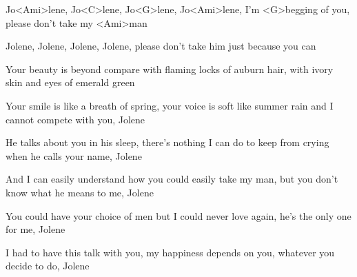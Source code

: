 

\zr
Jo<Ami>lene, Jo<C>lene, Jo<G>lene, Jo<Ami>lene,
I'm <G>begging of you, please don't take my <Ami>man

Jolene, Jolene, Jolene, Jolene,
please don't take him just because you can
\kr

\zs
Your beauty is beyond compare
with flaming locks of auburn hair,
with ivory skin and eyes of emerald green

Your smile is like a breath of spring,
your voice is soft like summer rain
and I cannot compete with you, Jolene
\ks

\zs
He talks about you in his sleep,
there's nothing I can do to keep
from crying when he calls your name, Jolene

And I can easily understand 
how you could easily take my man,
but you don't know what he means to me, Jolene
\ks

\zr\kr

\zs
You could have your choice of men
but I could never love again,
he's the only one for me, Jolene

I had to have this talk with you,
my happiness depends on you,
whatever you decide to do, Jolene
\ks
 
\zr\kr

\kp
